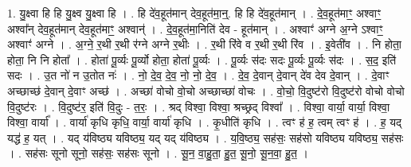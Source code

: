 \documentclass[17pt]{extarticle}
\begin{document}
1. यु॒क्ष्वा हि हि यु॒क्ष्व यु॒क्ष्वा हि । . हि दे॑व॒हूत॑मान् देव॒हूत॑मा॒न्॒. हि हि दे॑व॒हूत॑मान् । . दे॒व॒हूत॑माꣳ॒॒ अश्वाꣳ॒॒ अश्वा᳚न् देव॒हूत॑मान् देव॒हूत॑माꣳ॒॒ अश्वान्॑ । . दे॒व॒हूत॑मा॒निति॑ देव - हूत॑मान् । . अश्वाꣳ॑ अग्ने अ॒ग्ने ऽश्वाꣳ॒॒ अश्वाꣳ॑ अग्ने । . अ॒ग्ने॒ र॒थी र॒थी र॑ग्ने अग्ने र॒थीः । . र॒थी रि॑वे व र॒थी र॒थी रि॑व । . इ॒वेती॑व । . नि होता॒ होता॒ नि नि होता᳚ । . होता॑ पू॒र्व्यः पू॒र्व्यो होता॒ होता॑ पू॒र्व्यः । . पू॒र्व्यः स॑दः सदः पू॒र्व्यः पू॒र्व्यः स॑दः । . स॒द॒ इति॑ सदः । . उ॒त नो॑ न उ॒तोत नः॑ । . नो॒ दे॒व॒ दे॒व॒ नो॒ नो॒ दे॒व॒ । . दे॒व॒ दे॒वान् दे॒वान् दे॑व देव दे॒वान् । . दे॒वाꣳ अच्छाच्छ॑ दे॒वान् दे॒वाꣳ अच्छ॑ । . अच्छा॑ वोचो वो॒चो अच्छाच्छा॑ वोचः । . वो॒चो॒ वि॒दुष्ट॑रो वि॒दुष्ट॑रो वोचो वोचो वि॒दुष्ट॑रः । . वि॒दुष्ट॑र॒ इति॑ वि॒दुः - त॒रः॒ । . श्रद् विश्वा॒ विश्वा॒ श्रच्छ्रद् विश्वा᳚ । . विश्वा॒ वार्या॒ वार्या॒ विश्वा॒ विश्वा॒ वार्या᳚ । . वार्या॑ कृधि कृधि॒ वार्या॒ वार्या॑ कृधि । . कृ॒धीति॑ कृधि । . त्वꣳ ह॑ ह॒ त्वम् त्वꣳ ह॑ । . ह॒ यद् यद्ध॑ ह॒ यत् । . यद् य॑विष्ठ्य यविष्ठ्य॒ यद् यद् य॑विष्ठ्य । . य॒वि॒ष्ठ्य॒ सह॑सः॒ सह॑सो यविष्ठ्य यविष्ठ्य॒ सह॑सः । . सह॑सः सूनो सूनो॒ सह॑सः॒ सह॑सः सूनो । . सू॒न॒ वा॒हु॒ता॒ हु॒त॒ सू॒नो॒ सू॒न॒वा॒ हु॒त॒ । \newline
\end{document}
